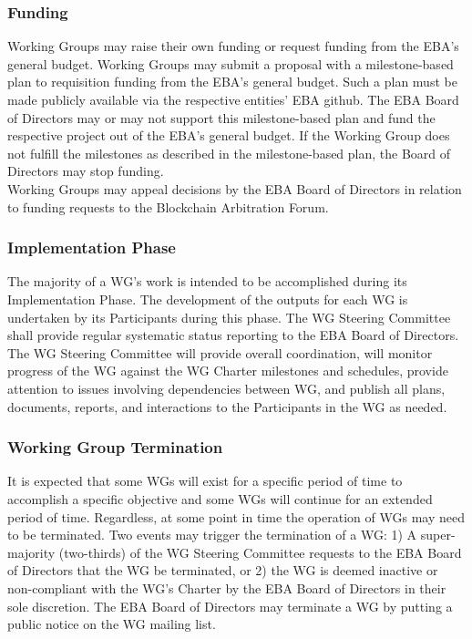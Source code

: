 \documentclass{article}
\begin{document}
\subsubsection{Funding}

Working Groups may raise their own funding or request funding from the EBA’s general budget. Working Groups may submit a proposal with a milestone-based plan to requisition funding from the EBA’s general budget. 
Such a plan must be made publicly available via the respective entities’ EBA github. 
The EBA Board of Directors may or may not support this milestone-based plan and fund the respective project out of the EBA’s general budget. 
If the Working Group does not fulfill the milestones as described in the milestone-based plan, the Board of Directors may stop funding. \\
Working Groups may appeal decisions by the EBA Board of Directors in relation to funding requests to the Blockchain Arbitration Forum.

\subsubsection{Implementation Phase}

The majority of a WG's work is intended to be accomplished during its Implementation Phase. 
The development of the outputs for each WG is undertaken by its Participants during this phase. 
The WG Steering Committee shall provide regular systematic status reporting to the EBA Board of Directors. 
The WG Steering Committee will provide overall coordination, will monitor progress of the WG against the WG Charter milestones and schedules, provide attention to issues involving dependencies between WG, and publish all plans, documents, reports, and interactions to the Participants in the WG as needed.

\subsubsection{Working Group Termination}

It is expected that some WGs will exist for a specific period of time to accomplish a specific objective and some WGs will continue for an extended period of time. 
Regardless, at some point in time the operation of WGs may need to be terminated. 
Two events may trigger the termination of a WG: 1) A super-majority (two-thirds) of the WG Steering Committee requests to the EBA Board of Directors that the WG be terminated, or 2) the WG is deemed inactive or non-compliant with the WG's Charter by the EBA Board of Directors in their sole discretion. 
The EBA Board of Directors may terminate a WG by putting a public notice on the WG mailing list.
\end{document}
